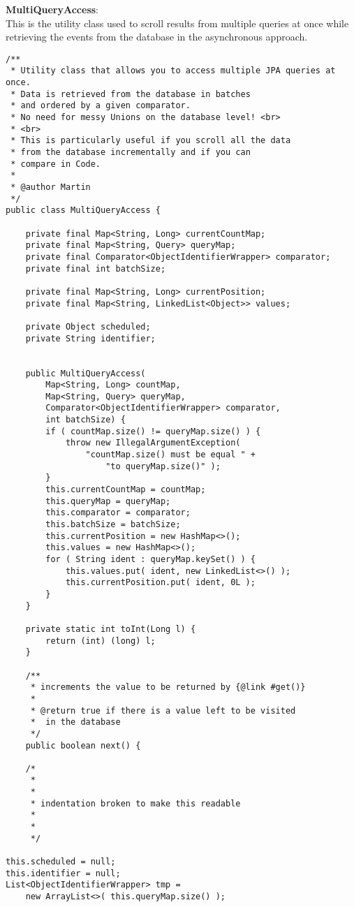 \noindent
\textbf{MultiQueryAccess}:\\
This is the utility class used to scroll results from multiple queries at once while retrieving the events from the database in the asynchronous approach.
\\
\lstset{language=java}
\begin{lstlisting}[frame=htrbl, caption={MultiQueryAccess.java}, label={lst:MultiQueryAccess.java}]
/**
 * Utility class that allows you to access multiple JPA queries at once.
 * Data is retrieved from the database in batches
 * and ordered by a given comparator.
 * No need for messy Unions on the database level! <br>
 * <br>
 * This is particularly useful if you scroll all the data 
 * from the database incrementally and if you can 
 * compare in Code.
 *
 * @author Martin
 */
public class MultiQueryAccess {

	private final Map<String, Long> currentCountMap;
	private final Map<String, Query> queryMap;
	private final Comparator<ObjectIdentifierWrapper> comparator;
	private final int batchSize;
	
	private final Map<String, Long> currentPosition;
	private final Map<String, LinkedList<Object>> values;
	
	private Object scheduled;
	private String identifier;


	public MultiQueryAccess(
		Map<String, Long> countMap,
		Map<String, Query> queryMap,
		Comparator<ObjectIdentifierWrapper> comparator,
		int batchSize) {
		if ( countMap.size() != queryMap.size() ) {
			throw new IllegalArgumentException( 
				"countMap.size() must be equal " + 
					"to queryMap.size()" );
		}
		this.currentCountMap = countMap;
		this.queryMap = queryMap;
		this.comparator = comparator;
		this.batchSize = batchSize;
		this.currentPosition = new HashMap<>();
		this.values = new HashMap<>();
		for ( String ident : queryMap.keySet() ) {
			this.values.put( ident, new LinkedList<>() );
			this.currentPosition.put( ident, 0L );
		}
	}

	private static int toInt(Long l) {
		return (int) (long) l;
	}

	/**
	 * increments the value to be returned by {@link #get()}
	 *
	 * @return true if there is a value left to be visited 
	 *	in the database
	 */
	public boolean next() {
	
	/*
	 *
	 *
	 * indentation broken to make this readable
	 *
	 *
	 */
	
this.scheduled = null;
this.identifier = null;
List<ObjectIdentifierWrapper> tmp =
	new ArrayList<>( this.queryMap.size() );


\end{lstlisting}
